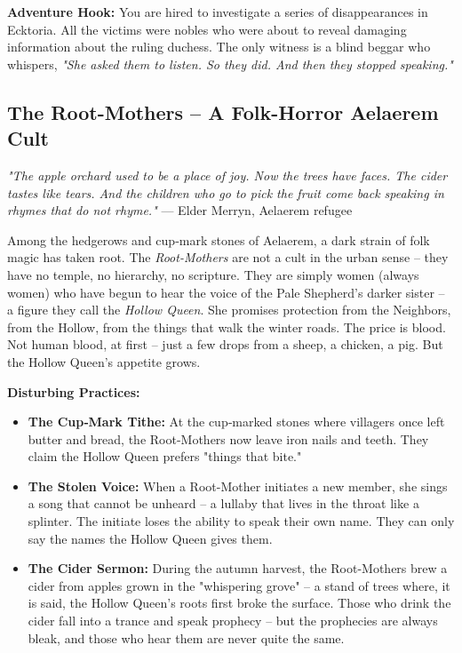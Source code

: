 \documentclass[10pt,a5paper]{book}
\begin{document}
\textbf{Adventure Hook:} You are hired to investigate a series of disappearances in Ecktoria. All the victims were nobles who were about to reveal damaging information about the ruling duchess. The only witness is a blind beggar who whispers, \textit{"She asked them to listen. So they did. And then they stopped speaking."}

\subsection{The Root-Mothers -- A Folk-Horror Aelaerem Cult}

\textit{"The apple orchard used to be a place of joy. Now the trees have faces. The cider tastes like tears. And the children who go to pick the fruit come back speaking in rhymes that do not rhyme."} --- Elder Merryn, Aelaerem refugee

Among the hedgerows and cup‑mark stones of Aelaerem, a dark strain of folk magic has taken root. The \textit{Root-Mothers} are not a cult in the urban sense -- they have no temple, no hierarchy, no scripture. They are simply women (always women) who have begun to hear the voice of the Pale Shepherd's darker sister -- a figure they call the \textit{Hollow Queen}. She promises protection from the Neighbors, from the Hollow, from the things that walk the winter roads. The price is blood. Not human blood, at first -- just a few drops from a sheep, a chicken, a pig. But the Hollow Queen's appetite grows.

\textbf{Disturbing Practices:}
\begin{itemize}
    \item \textbf{The Cup‑Mark Tithe:} At the cup‑marked stones where villagers once left butter and bread, the Root-Mothers now leave iron nails and teeth. They claim the Hollow Queen prefers "things that bite."
    \item \textbf{The Stolen Voice:} When a Root-Mother initiates a new member, she sings a song that cannot be unheard -- a lullaby that lives in the throat like a splinter. The initiate loses the ability to speak their own name. They can only say the names the Hollow Queen gives them.
    \item \textbf{The Cider Sermon:} During the autumn harvest, the Root-Mothers brew a cider from apples grown in the "whispering grove" -- a stand of trees where, it is said, the Hollow Queen's roots first broke the surface. Those who drink the cider fall into a trance and speak prophecy -- but the prophecies are always bleak, and those who hear them are never quite the same.
\end{itemize}
\end{document}
